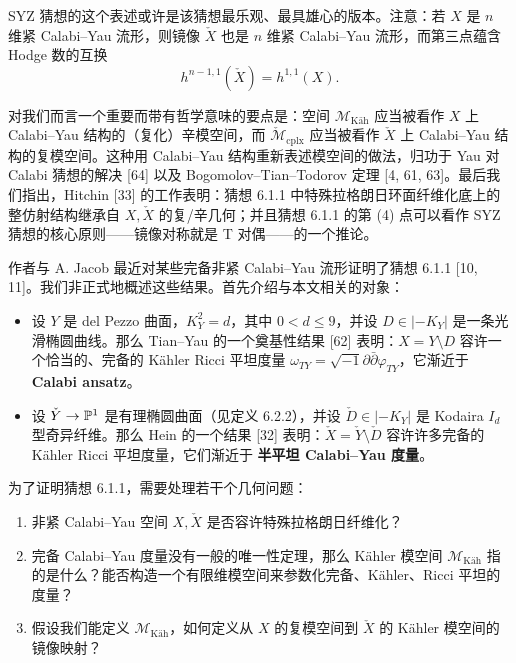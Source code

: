 SYZ 猜想的这个表述或许是该猜想最乐观、最具雄心的版本。注意：若 $X$ 是 $n$ 维紧 Calabi--Yau 流形，则镜像 $\check X$ 也是 $n$ 维紧 Calabi--Yau 流形，而第三点蕴含 Hodge 数的互换
\[
h^{n-1,1}(\check X)=h^{1,1}(X).
\]

对我们而言一个重要而带有哲学意味的要点是：空间 $\mathcal{M}_{\mathrm{Käh}}$ 应当被看作 $X$ 上 Calabi--Yau 结构的（复化）辛模空间，而 $\check{\mathcal{M}}_{\mathrm{cplx}}$ 应当被看作 $\check X$ 上 Calabi--Yau 结构的复模空间。这种用 Calabi--Yau 结构重新表述模空间的做法，归功于 Yau 对 Calabi 猜想的解决 [64] 以及 Bogomolov--Tian--Todorov 定理 [4, 61, 63]。最后我们指出，Hitchin [33] 的工作表明：猜想 6.1.1 中特殊拉格朗日环面纤维化底上的整仿射结构继承自 $X,\check X$ 的复/辛几何；并且猜想 6.1.1 的第 (4) 点可以看作 SYZ 猜想的核心原则------镜像对称就是 T 对偶------的一个推论。

作者与 A. Jacob 最近对某些完备非紧 Calabi--Yau 流形证明了猜想 6.1.1 [10, 11]。我们非正式地概述这些结果。首先介绍与本文相关的对象：
\begin{itemize}
\item 设 $Y$ 是 del Pezzo 曲面，$K_Y^2=d$，其中 $0<d\le 9$，并设 $D\in|-K_Y|$ 是一条光滑椭圆曲线。那么 Tian--Yau 的一个奠基性结果 [62] 表明：$X=Y\setminus D$ 容许一个恰当的、完备的 Kähler Ricci 平坦度量 $\omega_{TY}=\sqrt{-1}\partial\bar\partial\varphi_{TY}$，它渐近于 \textbf{Calabi ansatz}。
\item 设 $\check Y\to\mathbb{P}^1$ 是有理椭圆曲面（见定义 6.2.2），并设 $\check D\in|-K_Y|$ 是 Kodaira $I_d$ 型奇异纤维。那么 Hein 的一个结果 [32] 表明：$\check X=\check Y\setminus\check D$ 容许许多完备的 Kähler Ricci 平坦度量，它们渐近于 \textbf{半平坦 Calabi--Yau 度量}。
\end{itemize}

为了证明猜想 6.1.1，需要处理若干个几何问题：
\begin{enumerate}
\item[(1)] 非紧 Calabi--Yau 空间 $X,\check X$ 是否容许特殊拉格朗日纤维化？
\item[(2)] 完备 Calabi--Yau 度量没有一般的唯一性定理，那么 Kähler 模空间 $\mathcal{M}_{\mathrm{Käh}}$ 指的是什么？能否构造一个有限维模空间来参数化完备、Kähler、Ricci 平坦的度量？
\item[(3)] 假设我们能定义 $\mathcal{M}_{\mathrm{Käh}}$，如何定义从 $X$ 的复模空间到 $\check X$ 的 Kähler 模空间的镜像映射？
\end{enumerate}

